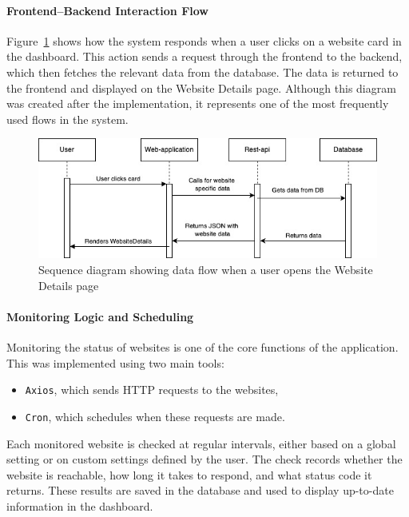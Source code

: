 \paragraph{Frontend--Backend Interaction Flow}

Figure~\ref{fig:sequence_website_details} shows how the system responds when a user clicks on a website card in the dashboard. This action sends a request through the frontend to the backend, which then fetches the relevant data from the database. The data is returned to the frontend and displayed on the Website Details page. Although this diagram was created after the implementation, it represents one of the most frequently used flows in the system.

\begin{figure}[H]
\centering
\includegraphics[width=0.9\linewidth]{figures/diagrams/Sequence_diagram.jpg}
\caption{Sequence diagram showing data flow when a user opens the Website Details page}
\label{fig:sequence_website_details}
\end{figure}

\paragraph{Monitoring Logic and Scheduling}

Monitoring the status of websites is one of the core functions of the application. This was implemented using two main tools:
\begin{itemize}
    \item \texttt{Axios}, which sends HTTP requests to the websites,
    \item \texttt{Cron}, which schedules when these requests are made.
\end{itemize}

Each monitored website is checked at regular intervals, either based on a global setting or on custom settings defined by the user. The check records whether the website is reachable, how long it takes to respond, and what status code it returns. These results are saved in the database and used to display up-to-date information in the dashboard.

